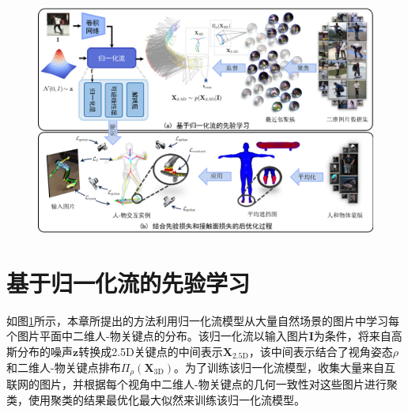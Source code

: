 \begin{figure}[t]
	\centering
	\includegraphics[width=\linewidth]{Img/pipeline_2d}
	\label{fig:pipeline_2d}
\end{figure}

\section{基于归一化流的先验学习}

如图\ref{fig:pipeline_2d}所示，本章所提出的方法利用归一化流模型从大量自然场景的图片中学习每个图片平面中二维人-物关键点的分布。该归一化流以输入图片$\mathbf{I}$为条件，将来自高斯分布的噪声$\mathbf{z}$转换成2.5D关键点的中间表示$\mathbf{X}_{\text{2.5D}}$，该中间表示结合了视角姿态$\rho$和二维人-物关键点排布$\Pi_\rho(\mathbf{X}_{\text{3D}})$。为了训练该归一化流模型，收集大量来自互联网的图片，并根据每个视角中二维人-物关键点的几何一致性对这些图片进行聚类，使用聚类的结果最优化最大似然来训练该归一化流模型。

